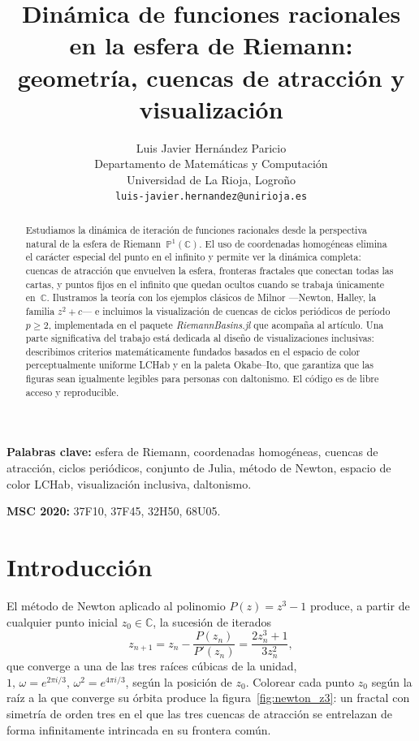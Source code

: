 \documentclass[11pt,a4paper]{article}
\title{\textbf{Dinámica de funciones racionales en la esfera de Riemann:
       geometría, cuencas de atracción y visualización}}
\author{Luis Javier Hernández Paricio\\
        {\small Departamento de Matemáticas y Computación}\\
        {\small Universidad de La Rioja, Logroño}\\
        {\small \texttt{luis-javier.hernandez@unirioja.es}}}
\date{} %
\theoremstyle{plain}
\theoremstyle{definition}
\theoremstyle{remark}
\newcommand{\C}{\mathbb{C}}
\newcommand{\Puno}{\mathbb{P}^1(\mathbb{C})}
\newcommand{\pkg}[1]{\textsl{#1}}
\begin{document}

\maketitle

\begin{abstract}
Estudiamos la dinámica de iteración de funciones racionales desde la
perspectiva natural de la esfera de Riemann~$\Puno$.
El uso de coordenadas homogéneas elimina el carácter especial del punto
en el infinito y permite ver la dinámica completa: cuencas de atracción
que envuelven la esfera, fronteras fractales que conectan todas las
cartas, y puntos fijos en el infinito que quedan ocultos cuando se
trabaja únicamente en~$\C$.
Ilustramos la teoría con los ejemplos clásicos de Milnor —Newton,
Halley, la familia $z^2+c$— e incluimos la visualización de cuencas
de ciclos periódicos de período~$p\geq 2$, implementada en el paquete
\pkg{RiemannBasins.jl} que acompaña al artículo.
Una parte significativa del trabajo está dedicada al diseño de
visualizaciones inclusivas: describimos criterios matemáticamente
fundados basados en el espacio de color perceptualmente uniforme LCHab
y en la paleta Okabe--Ito, que garantiza que las figuras sean
igualmente legibles para personas con daltonismo.
El código es de libre acceso y reproducible.
\end{abstract}

\bigskip
\noindent\textbf{Palabras clave:} esfera de Riemann, coordenadas homogéneas,
cuencas de atracción, ciclos periódicos, conjunto de Julia, método de Newton,
espacio de color LCHab, visualización inclusiva, daltonismo.

\medskip
\noindent\textbf{MSC 2020:} 37F10, 37F45, 32H50, 68U05.

\section{Introducción}

El método de Newton aplicado al polinomio $P(z)=z^3-1$ produce, a partir
de cualquier punto inicial $z_0\in\C$, la sucesión de iterados
\[
   z_{n+1} = z_n - \frac{P(z_n)}{P'(z_n)}
           = \frac{2z_n^3+1}{3z_n^2},
\]
que converge a una de las tres raíces cúbicas de la unidad,
$1,\,\omega=e^{2\pi i/3},\,\omega^2=e^{4\pi i/3}$, según la posición de
$z_0$.
Colorear cada punto $z_0$ según la raíz a la que converge su órbita
produce la figura~\ref{fig:newton_z3}: un fractal con simetría de orden
tres en el que las tres cuencas de atracción se entrelazan de forma
infinitamente intrincada en su frontera común.
\end{document}
